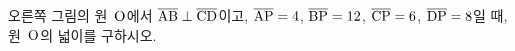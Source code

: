 \noindent\begin{minipage}[t]{0.58\linewidth}\vspace{0pt}\raggedright 오른쪽 그림의 원~$\mathrm{O}$에서 $\overline{\mathrm{AB}}\perp\overline{\mathrm{CD}}$이고, $\overline{\mathrm{AP}}=4$, $\overline{\mathrm{BP}}=12$, $\overline{\mathrm{CP}}=6$, $\overline{\mathrm{DP}}=8$일 때, 원~$\mathrm{O}$의 넓이를 구하시오.\end{minipage}\hfill\begin{minipage}[t]{0.4\linewidth}\vspace{0pt}\centering \resizebox{\ifdim\width>\linewidth\linewidth\else\width\fi}{!}{}\end{minipage}\par
